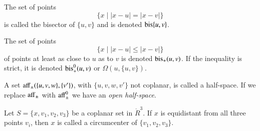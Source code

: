 \begin{tarskidata}
\begin{tarski}
\begin{definition}[bisector]
The set of points 
   $$
   \{ x \mid |x - u | = |x-v|\}
   $$
is called the bisector of $\{u,v\}$ and is denoted
${\operatorname{bis}}\{u,v\}$.
\end{definition}
\end{tarski}

\begin{tarski}

\begin{definition}[$\op{bis}_+$]
The set of points
   $$
   \{ x \mid |x- u | \le |x-v|\}
   $$
of points at least as close to $u$ as to $v$ is denoted
${\operatorname{bis}}_+(u,v)$.  If the inequality is strict, it is denoted
${\operatorname{bis}}_+^0(u,v)$ or $\Omega(u,\{u,v\})$.
\end{definition}
\end{tarski}

\begin{tarski}

\begin{definition}
A set ${\operatorname{aff}}_{\pm}(\{u,v,w\},\{v'\})$,
with $\{u,v,w,v'\}$ not coplanar, is called a half-space.  If
we replace ${\operatorname{aff}}_{\pm}$ with ${\operatorname{aff}}_{\pm}^0$ we have an
{\it open half-space}.
\end{definition}
\end{tarski}






\begin{tarski}

\begin{definition}[circumcenter]
Let $S=\{x,v_1,v_2,v_3\}$ be a coplanar set in $\ring{R}^3$.  If $x$ 
is equidistant from all three points $v_i$, then $x$ is called a
circumcenter of $\{v_1,v_2,v_3\}$.
\end{definition}
\end{tarski}

\begin{tarski}


\end{tarski}
\end{tarskidata}
